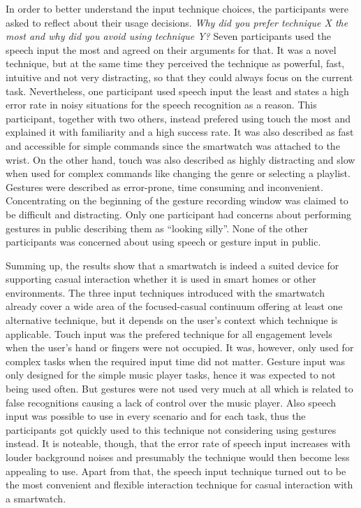 In order to better understand the input technique choices, the participants were asked to reflect about their usage decisions. \textit{Why did you prefer technique X the most and why did you avoid using technique Y?} Seven participants used the speech input the most and agreed on their arguments for that. It was a novel technique, but at the same time they perceived the technique as powerful, fast, intuitive and not very distracting, so that they could always focus on the current task. Nevertheless, one participant used speech input the least and states a high error rate in noisy situations for the speech recognition as a reason. This participant, together with two others, instead prefered using touch the most and explained it with familiarity and a high success rate. It was also described as fast and accessible for simple commands since the smartwatch was attached to the wrist. On the other hand, touch was also described as highly distracting and slow when used for complex commands like changing the genre or selecting a playlist. Gestures were described as error-prone, time consuming and inconvenient. Concentrating on the beginning of the gesture recording window was claimed to be difficult and distracting. Only one participant had concerns about performing gestures in public describing them as ``looking silly''. None of the other participants was concerned about using speech or gesture input in public. \\

\newpage

Summing up, the results show that a smartwatch is indeed a suited device for supporting casual interaction whether it is used in smart homes or other environments. The three input techniques introduced with the smartwatch already cover a wide area of the focused-casual continuum offering at least one alternative technique, but it depends on the user's context which technique is applicable. Touch input was the prefered technique for all engagement levels when the user's hand or fingers were not occupied. It was, however, only used for complex tasks when the required input time did not matter.
Gesture input was only designed for the simple music player tasks, hence it was expected to not being used often. But gestures were not used very much at all which is related to false recognitions causing a lack of control over the music player. Also speech input was possible to use in every scenario and for each task, thus the participants got quickly used to this technique not considering using gestures instead. It is noteable, though, that the error rate of speech input increases with louder background noises and presumably the technique would then become less appealing to use. Apart from that, the speech input technique turned out to be the most convenient and flexible interaction technique for casual interaction with a smartwatch.

